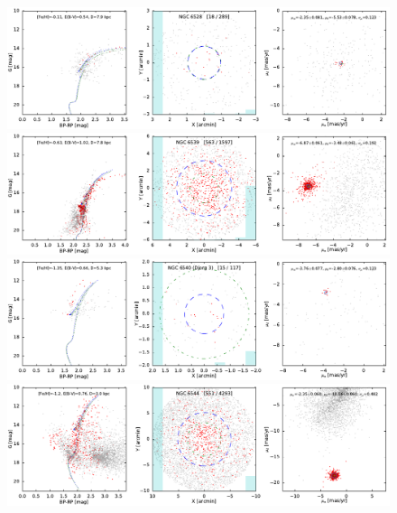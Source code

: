 \documentclass[usenatbib]{mnras}
\begin{document}
\clearpage\begin{figure}
\contcaption{}
\includegraphics{figs/NGC_6528.pdf}
\includegraphics{figs/NGC_6539.pdf}
\includegraphics{figs/NGC_6540_Djorg.pdf}
\includegraphics{figs/NGC_6544.pdf}
\end{figure}
\end{document}

